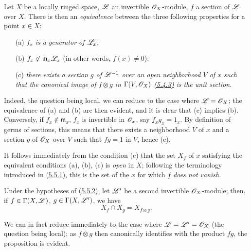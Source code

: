 \begin{env}[5.5.2]
\label{env-0.5.5.2}
Let $X$ be a locally ringed space, $\mathscr{L}$ an invertible $\mathscr{O}_X$-module, $f$ a
section of $\mathscr{L}$ over $X$. There is then an {\em equivalence} between the
three following properties for a point $x\in X$:
\begin{itemize}
  \item[(a)] {\em $f_x$ is a generator of $\mathscr{L}_x$};
  \item[(b)] {\em $f_x\not\in\mathfrak{m}_x\mathscr{L}_x$} (in other words, $f(x)\neq 0$);
  \item[(c)] {\em there exists a section $g$ of $\mathscr{L}^{-1}$ over an open
    neighborhood $V$ of $x$ such that the canonical image of $f\otimes g$
    in $\Gamma(V,\mathscr{O}_X)$ \hyperref[env-0.5.4.3]{(5.4.3)} is the unit section}.
\end{itemize}

Indeed, the question being local, we can reduce to the case where
$\mathscr{L}=\mathscr{O}_X$; the equivalence of (a) and (b) are then evident, and it is clear
that (c) implies (b). Conversely, if $f_x\not\in\mathfrak{m}_x$, $f_x$ is
invertible in $\mathscr{O}_x$, say $f_x g_x=1_x$. By definition of germs of sections,
this means that there exists a neighborhood $V$ of $x$ and a section $g$ of
$\mathscr{O}_X$ over $V$ such that $fg=1$ in $V$, hence (c).

It follows immediately from the condition (c) that the set $X_f$ of $x$ satisfying the
equivalent conditions (a), (b), (c) is {\em open} in $X$; following the terminology
introduced in \hyperref[env-0.5.5.1]{(5.5.1)}, this is the set of the $x$ for which {\em $f$ does not
vanish}.
\end{env}

\begin{env}[5.5.3]
\label{env-0.5.5.3}
Under the hypotheses of \hyperref[env-0.5.5.2]{(5.5.2)}, let $\mathscr{L}'$ be a second invertible
$\mathscr{O}_X$-module; then, if $f\in\Gamma(X,\mathscr{L})$, $g\in\Gamma(X,\mathscr{L}')$, we have
\[
  X_f\cap X_g=X_{f\otimes g}.
\]

We can in fact reduce immediately to the case where $\mathscr{L}=\mathscr{L}'=\mathscr{O}_X$ (the question
being local); as $f\otimes g$ then canonically identifies with the product $fg$, the
proposition is evident.
\end{env}

